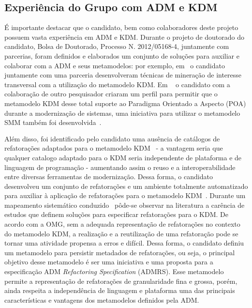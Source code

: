 \documentclass[12pt]{article}
\begin{document}
\subsection{Experiência do Grupo com ADM e KDM}

É importante destacar que o candidato, bem como colaboradores deste projeto possuem vasta experiência em ADM e KDM. Durante o projeto de doutorado do candidato, Bolsa de Doutorado, Processo N. 2012/05168-4, juntamente com parcerias, foram definidos e elaborados um conjunto de soluções para auxiliar e colaborar com a ADM e seus metamodelos: por exemplo, em~\cite{dani_san_tool, dani_san, daniel_san_journal} o candidato juntamente com uma parceria desenvolveram técnicas de mineração de interesse transversal com a utilização do metamodelo KDM. Em ~\cite{Santos_2014, santo_wmod} o candidato com a colaboração de outro pesquisador criaram um perfil para permitir que o metamodelo KDM desse total suporte ao Paradigma Orientado a Aspecto (POA) durante a modernização de sistemas, uma iniciativa para utilizar o metamodelo SMM também foi desenvolvida~\cite{honda_dissertacao}. 

Além disso, foi identificado pelo candidato uma ausência de catálogos de refatorações adaptados para o metamodelo KDM~\cite{durelli_systematic_mapping} - a vantagem seria que qualquer catalogo adaptado para o KDM seria independente de plataforma e de linguagem de programação - aumentando assim o reuso e a interoperabilidade entre diversas ferramentas de modernização. Dessa forma, o candidato desenvolveu um conjunto de refatorações e um ambiente totalmente automatizado para auxiliar à aplicação de refatorações para o metamodelo KDM~\cite{durelli_catalogo, durelli_VEM_ferramenta}. Durante um mapeamento sistemático conduzido~\cite{durelli_systematic_mapping} pôde-se observar na literatura a carência de estudos que definem soluções para especificar refatorações para o KDM. De acordo com a OMG, sem a adequada representação de refatorações no contexto do metamodelo KDM, a realização e a reutilização de uma refatoração pode se tornar uma atividade propensa a erros e difícil. Dessa forma, o candidato definiu um metamodelo para persistir metadados de refatorações, ou seja, o principal objetivo desse metamodelo é ser uma iniciativa e uma proposta para a especificação ADM \textit{Refactoring Specification} (ADMRS). Esse metamodelo permite a representação de refatorações de granularidade fina e grossa, porém, ainda respeita a independência de linguagem e plataforma uma das principais características e vantagens dos metamodelos definidos pela ADM. 
\end{document}
